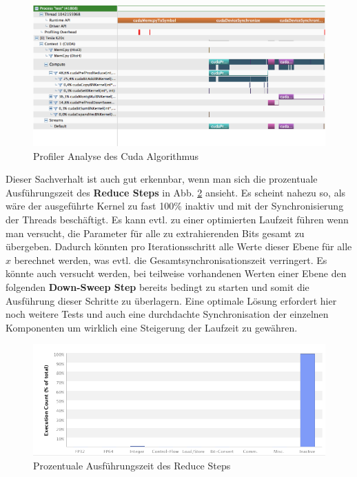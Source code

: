 \begin{figure}
\centering
\includegraphics[scale=0.45]{Kapitel/Implementierung/cuda_timeline.png}
\caption{Profiler Analyse des Cuda Algorithmus}
\label{figure:timeline}
\end{figure}

Dieser Sachverhalt ist auch gut erkennbar, wenn man sich die prozentuale Ausführungszeit des \textbf{Reduce Steps} in Abb. \ref{figure:exec_count} ansieht. Es scheint nahezu so, als wäre der ausgeführte Kernel zu fast 100\% inaktiv und mit der Synchronisierung der Threads beschäftigt. Es kann evtl. zu einer optimierten Laufzeit führen wenn man versucht, die Parameter für alle zu extrahierenden Bits gesamt zu übergeben. Dadurch könnten pro Iterationsschritt alle Werte dieser Ebene für alle $x$ berechnet werden, was evtl. die Gesamtsynchronisationszeit verringert. Es könnte auch versucht werden, bei teilweise vorhandenen Werten einer Ebene den folgenden \textbf{Down-Sweep Step} bereits bedingt zu starten und somit die Ausführung dieser Schritte zu überlagern. Eine optimale Lösung erfordert hier noch weitere Tests und auch eine durchdachte Synchronisation der einzelnen Komponenten um wirklich eine Steigerung der Laufzeit zu gewähren.

\begin{figure}
\centering
\includegraphics[scale=0.5]{Kapitel/Implementierung/cudaPrefProdReduce_execution_count.png}
\caption{Prozentuale Ausführungszeit des Reduce Steps}
\label{figure:exec_count}
\end{figure}


